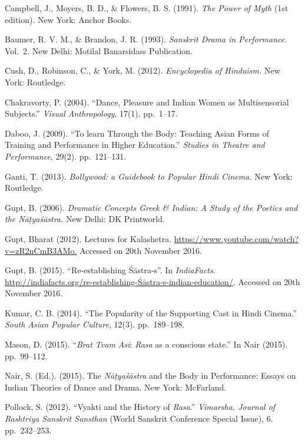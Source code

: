 \begin{thebibliography}{99}
\itemsep=2pt
Campbell, J., Moyers, B. D., \& Flowers, B. S. (1991). \textsl{The Power of Myth} (1st edition). New York: Anchor Books.

Baumer, R. V. M., \& Brandon, J. R. (1993). \textsl{Sanskrit Drama in Performance.} Vol.~2. New Delhi: Motilal Banarsidass Publication. 

Cush, D., Robinson, C., \& York, M. (2012). \textsl{Encyclopedia of Hinduism.} New York: Routledge.

Chakravorty, P. (2004). “Dance, Pleasure and Indian Women as Multisensorial Subjects.” \textsl{Visual Anthropology}, 17(1). pp.~1--17. 

Daboo, J. (2009). “To learn Through the Body: Teaching Asian Forms of Training and Performance in Higher Education.” \textsl{Studies in Theatre and Performance}, 29(2). pp.~121--131.

Ganti, T. (2013). \textsl{Bollywood: a Guidebook to Popular Hindi Cinema.} New York: Routledge. 

Gupt, B. (2006). \textsl{Dramatic Concepts Greek \& Indian: A Study of the Poetics and the Nāṭyaśāstra.} New Delhi: DK Printworld.

Gupt, Bharat (2012). Lectures for Kalashetra. \url{https://www.youtube.com/watch?v=zR2nCmB3AMo.} Accessed on 20th November 2016.

Gupt, B. (2015). “Re-establishing Śāstra-s”. In \textsl{IndiaFacts}. \url{http://indiafacts.org/re-establishing-Śāstra-s-indian-education/}. Accessed on 20th November 2016.

Kumar, C. B. (2014). “The Popularity of the Supporting Cast in Hindi Cinema.” \textsl{South Asian Popular Culture}, 12(3). pp.~189--198.

Mason, D. (2015). “\textsl{Brat Tvam Asi}: \textsl{Rasa} as a conscious state.” In Nair (2015). pp.~99--112.

Nair, S. (Ed.). (2015). The \textsl{Nāṭyaśāstra} and the Body in Performance: Essays on Indian Theories of Dance and Drama. New York: McFarland.

Pollock, S. (2012). “Vyakti and the History of \textsl{Rasa}.” \textsl{Vimarsha, Journal of Rashtriya Sanskrit Sansthan} (World Sanskrit Conference Special Issue), 6. pp.~232--253.


\end{thebibliography}

